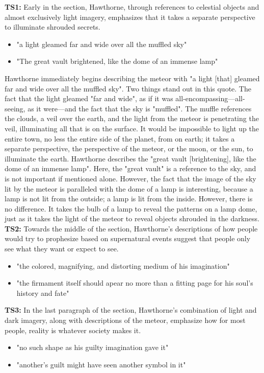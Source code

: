 \documentclass[12pt,a4paper]{article}
\begin{document}
    \textbf{TS1:} Early in the section, Hawthorne, through references to celestial objects
        and almost exclusively light imagery, emphasizes that it takes a separate perspective
        to illuminate shrouded secrets.
    \begin{itemize}
        \item "a light gleamed far and wide over all the muffled sky"
        \item "The great vault brightened, like the dome of an immense lamp"
    \end{itemize}
    Hawthorne immediately begins describing the meteor with "a light [that] gleamed
    far and wide over all the muffled sky". Two things stand out in this quote. The
    fact that the light gleamed "far and wide", as if it was all-encompassing---all-seeing,
    as it were---and the fact that the sky is "muffled". The muffle references the clouds,
    a veil over the earth, and the light from the meteor is penetrating the veil, illuminating
    all that is on the surface. It would be impossible to light up the entire town, no
    less the entire side of the planet, from on earth; it takes a separate perspective,
    the perspective of the meteor, or the moon, or the sun, to illuminate the earth.
    Hawthorne describes the "great vault [brightening], like the dome of an immense
    lamp". Here, the "great vault" is a reference to the sky, and is not important
    if mentioned alone. However, the fact that the image of the sky lit by the meteor is
    paralleled with the dome of a lamp is interesting, because a lamp is not lit from
    the outside; a lamp is lit from the inside. However, there is no difference. It takes
    the bulb of a lamp to reveal the patterns on a lamp dome, just as it takes the light
    of the meteor to reveal objects shrouded in the darkness.
    \\
    \textbf{TS2:} Towards the middle of the section, Hawthorne's descriptions of how
        people would try to prophesize based on supernatural events suggest that people
        only see what they want or expect to see.
    \begin{itemize}
        \item "the colored, magnifying, and distorting medium of his imagination"
        \item "the firmament itself should apear no more than a fitting page for his soul's history and fate"
    \end{itemize}
    \textbf{TS3:} In the last paragraph of the section, Hawthorne's combination of
        light and dark imagery, along with descriptions of the meteor, emphasize how
        for most people, reality is whatever society makes it.
    \begin{itemize}
        \item "no such shape as his guilty imagination gave it"
        \item "another's guilt might have seen another symbol in it"
    \end{itemize}
\end{document}
